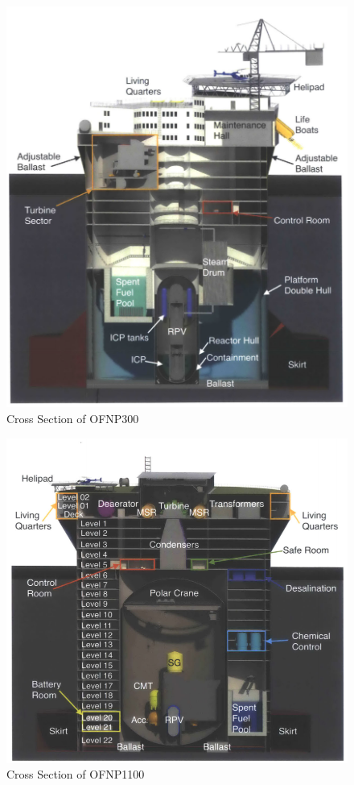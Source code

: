 \documentclass[12pt]{article}
\begin{document}
\begin{itemize}
    \begin{figure}[H]                                  
        \centering                                     
        \includegraphics[width=\textwidth]{OFNP300}   
        \caption{Cross Section of OFNP300}
        \label{fig:OFNP300}     
    \end{figure}
    
    \begin{figure}[H]                                  
        \centering                                     
        \includegraphics[width=\textwidth]{OFNP1100}   
        \caption{Cross Section of OFNP1100}
        \label{fig:OFNP1100}     
    \end{figure}
    

\end{itemize}
\end{document}
